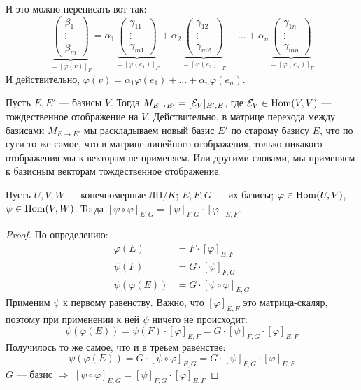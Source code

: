 И это можно переписать вот так:
$$
\underbrace{
\begin{pmatrix}
    \beta_1 \\
    \vdots \\ 
    \beta_m
\end{pmatrix}
}_{=[\varphi(v)]_F}
=
\alpha_1
\underbrace{
\begin{pmatrix}
    \gamma_{11} \\ 
    \vdots \\ 
    \gamma_{m1}
\end{pmatrix}
}_{=[\varphi(e_1)]_F}
+
\alpha_2
\underbrace{
\begin{pmatrix}
    \gamma_{12} \\ 
    \vdots \\ 
    \gamma_{m2}
\end{pmatrix}
}_{=[\varphi(e_2)]_F}
+
\dots
+
\alpha_n
\underbrace{
\begin{pmatrix}
    \gamma_{1n} \\ 
    \vdots \\ 
    \gamma_{mn}
\end{pmatrix}
}_{=[\varphi(e_n)]_F}
$$
И действительно, 
$\varphi(v) = \alpha_1 \varphi(e_1) + \dots + \alpha_n \varphi(e_n)$.

\notice Пусть $E, E'$ --- базисы $V$. Тогда $M_{E \to E'} =
[\mathcal{E}_V]_{E', E}$, где $\mathcal{E}_V \in \operatorname{Hom}(V, V)$ --- тождественное отображение на $V$.
Действительно, в матрице перехода между базисами 
$M_{E \to E'}$ мы раскладываем новый базис $E'$ по старому базису $E$,
что по сути то же самое, что в матрице линейного отображения, только
никакого отображения мы к векторам не применяем. Или другими словами,
мы применяем к базисным векторам тождественное отображение.

\begin{theorem}
    Пусть $U, V, W$ --- конечномерные ЛП/$K$; $E, F, G$ --- их базисы;
    $\varphi \in \operatorname{Hom}(U, V)$, $\psi \in \operatorname{Hom}(V, W)$. Тогда
    $[\psi \circ \varphi]_{E,G} = [\psi]_{F,G} \cdot [\varphi]_{E,F}$.
\end{theorem}
\begin{proof}
    По определению:
    \begin{align*}
        \varphi(E) &= F \cdot [\varphi]_{E, F} \\
        \psi(F) &= G \cdot [\psi]_{F, G} \\
        \psi(\varphi(E)) &= G \cdot [\psi \circ \varphi]_{E, G} 
    \end{align*}
    Применим $\psi$ к первому равенству.
    Важно, что $[\varphi]_{E, F}$ это матрица-скаляр, поэтому при применении к ней $\psi$ ничего не происходит:
    \[ \psi(\varphi(E)) = \psi(F) \cdot [\varphi]_{E, F} = G \cdot [\psi]_{F, G} \cdot [\varphi]_{E, F}  \]
    Получилось то же самое, что и в треьем равенстве:
    \[ \psi(\varphi(E)) = G \cdot [\psi \circ \varphi]_{E, G} = G \cdot [\psi]_{F, G} \cdot [\varphi]_{E, F}  \]
    $G$ --- базис $\Longrightarrow$ 
    $[\psi \circ \varphi]_{E,G} = [\psi]_{F,G} \cdot [\varphi]_{E,F}$
\end{proof}

